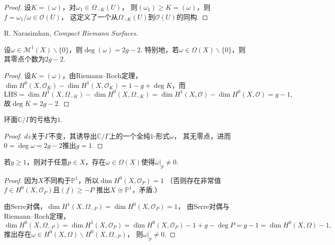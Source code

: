 \begin{proof}
	设$K=(\omega)$，对$\omega_1\in \Omega_{-K}(U)$，
    则$(\omega_1)\geq K=(\omega)$，则$f=\omega_1/\omega \in \mathcal{O}(U)$，
    这定义了一个从$\Omega_{-K}(U)$到$\mathcal{O}(U)$的同构.
\end{proof}

\begin{remark}
	R. Narasimhan, \textit{Compact Riemann Surfaces}.
\end{remark}

\begin{theorem}
	设$\omega\in \mathscr{M}^1(X)\backslash \{0\}$，则$\deg (\omega)=2g-2$. 
    特别地，若$\omega\in \Omega(X)\backslash \{0\}$，则其零点个数为$2g-2$.
\end{theorem}

\begin{proof}
	设$K=(\omega)$，由Riemann--Roch定理，
    $\dim H^0(X,\mathcal{O}_K)-\dim H^1(X, \mathcal{O}_K)=1-g+\deg K$，而
	$$\text{LHS}=\dim H^1(X, \Omega_{-K})-\dim H^0(X, \Omega_{-K})
    =\dim H^1(X, \mathcal{O})-\dim H^0(X, \mathcal{O})=g-1,$$
	故$\deg K=2g-2$.
\end{proof}

\begin{corollary}
	环面$\mathbb{C}/\Gamma$的亏格为$1$.
\end{corollary}

\begin{proof}
	$dz$关于$\Gamma$不变，其诱导出$\mathbb{C}/\Gamma$上的一个全纯$1$-形式$\omega$，
    其无零点，进而$0=\deg \omega=2g-2$推出$g=1$.
\end{proof}

\begin{theorem}
	若$g\geq 1$，则对于任意$p\in X$，存在$\omega\in \Omega(X)$使得$\omega|_p\neq 0$.
\end{theorem}

\begin{proof}
	因为$X$不同构于$\mathbb{P}^1$，所以$\dim H^0(X, \mathcal{O}_P)=1$
    （否则存在非常值$f\in H^0(X, \mathcal{O}_P)$且$(f)\geq -P$
    推出$X\cong \mathbb{P}^1$，矛盾.）

	由Serre对偶，$\dim H^1(X, \Omega_{-P})=\dim H^0(X, \mathcal{O}_P)=1$，
    由Serre对偶与Riemann--Roch定理，
	$$\dim H^0(X, \Omega_{-P})=\dim H^1(X, \mathcal{O}_{P})=\dim H^0(X, \mathcal{O}_{P})-1+g-\deg P=g-1=\dim H^0(X,\Omega)-1,$$
	推出存在$\omega\in H^0(X, \Omega)\backslash H^0(X, \Omega_{-P})$，
    则$\omega|_p\neq 0$.
\end{proof}	

